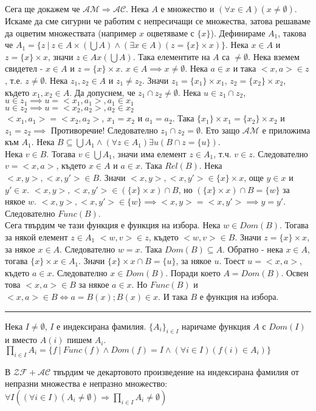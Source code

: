 \documentclass[fleqn, titlepage, 12pt]{report}
\begin{document}
Сега ще докажем че $ \mathcal{AM} \Rightarrow \mathcal{AC} $. Нека $ A $ е множество и
$ (\forall{x \in A})(x \neq \emptyset) $. Искаме да сме сигурни че работим с непресичащи се множества, затова решаваме
да оцветим множествата (например $ x $ оцветяваме с $ \{ x \} $). Дефинираме $ A_1 $, такова че
$ A_1 = \{z\ |\ z \in A \times (\bigcup A) \land (\exists{x \in A})(z = \{ x \} \times  x)\} $.
Нека $ x \in A $ и $ z = \{ x \} \times  x $, значи $ z \in A x (\bigcup A) $.
Така елементите на $ A $ са $ \neq \emptyset $. Нека вземем свидетел - $ x \in A $ и $ z = \{ x \} \times  x $.
$  x \in A \implies x \neq \emptyset $.
Нека $ a \in x $ и така $ <x,a> \in z $, т.е. $ z \neq \emptyset $. Нека $ z_1, z_2 \in A $ и $ z_1 \neq z_2 $.
Значи $ z_1 = \{ x_1 \} \times x_1 $, $z_2 = \{ x_2 \} \times x_2 $, където $ x_1, x_2 \in A $.
Да допуснем, че $ z_1 \cap z_2 \neq \emptyset $. Нека $ u \in z_1 \cap z_2 $,\\
$ u \in z_1 \implies u = <x_1, a_1>, a_1 \in x_1 $\\
$ u \in z_2 \implies u = <x_2, a_2>, a_2 \in x_2 $\\
$ <x_1, a_1> = <x_2, a_2> $, $ x_1 = x_2 $ и $ a_1 = a_2 $. Така $ \{ x_1 \} \times  x_1 = \{ x_2 \} \times  x_2 $
и $ z_1 = z_2 \implies $ Противоречие! Следователно $ z_1 \cap z_2 = \emptyset $. Ето защо $ \mathcal{AM} $ е приложима
към $ A_1 $. Нека $ B \subseteq \bigcup A_1 \land (\forall{z \in A_1})\exists{u}(B \cap z = \{ u \}) $.\\
Нека $ v \in B $. Тогава $ v \in \bigcup A_1 $, значи има елемент $ z \in A_1 $, т.ч. $ v \in z $.
Следователно $ v = <x,a> $, където $ x \in A $ и $ a \in x $. Така $ Rel(B) $. Нека $ <x,y>,<x,y'> \in B $.
Значи $ <x,y>, <x,y'>  \in \{ x \}\times x$, още $ y \in x $ и $ y' \in x $.
$ <x,y>,<x,y'> \in (\{ x \} \times  x) \cap B$, но $ (\{ x \} \times  x) \cap B = \{ w \} $ за някое $ w $.
$ <x,y>, <x,y'> \in \{ w \} \implies <x,y> = <x,y'> \implies y = y' $. Следователно $ Func(B) $.\\
Сега твърдим че тази функция е функция на избора. Нека $ w \in Dom(B) $. Тогава за някой елемент $ z \in A_1 $
$ <w,v> \in z $, където $ <w,v> \in B $. Значи $ z = \{ x \} \times  x $, за някое $ x \in A $.
Следователно $ w = x $. Така $ Dom(B) \subseteq A $. Обратно - нека $ x \in A $, тогава $ \{ x \} \times x \in A_1$.
Значи $ \{ x \} \times x \cap B = \{ u \} $, за някое $ u $. Тоест $ u = <x,a> $, където $ a \in x $.
Следователно $ x \in Dom(B) $. Поради което $ A = Dom(B) $. Освен това $ <x,a> \in B $ за някое $ a \in x $.
Но $ Func(B) $ и $ <x,a> \in B \Leftrightarrow  a = B(x); B(x) \in x$. И така $ B $ е функция на избора.

\bigbreak
\hrule
\bigbreak

 Нека $ I \neq \emptyset $, $ I $ е индексирана фамилия.
$ \{ A_i \}_{i \in I} $ наричаме функция $ A $ с $ Dom(I) $ и вместо $ A(i) $ пишем $ A_i $.
\bigbreak
$ \prod_{i \in I} A_i = \{f\ |\ Func(f) \land Dom(f) = I \land (\forall{i \in I})(f(i) \in A_i)\}  $
\bigbreak

 В $ \mathcal{ZF} + \mathcal{AC} $ твърдим че декартовото произведение на индексирана фамилия от непразни
множества е непразно множество:
$ \forall{I}((\forall{i \in I})(A_i \neq \emptyset) \Rightarrow \prod_{i \in I} A_i \neq \emptyset  ) $
\end{document}
